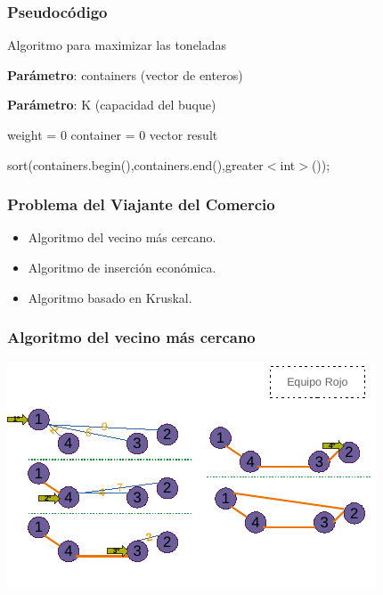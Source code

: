 \documentclass[13pt]{beamer}
\begin{document}
	\begin{frame}
		\frametitle{Pseudocódigo}
		\begin{algorithm}[H]
			\caption{Algoritmo para maximizar las toneladas}\label{alg:max_toneladas}
			\begin{minipage}{0.92\textwidth}
		
			\textbf{Parámetro}: containers (vector de enteros)
		
			\textbf{Parámetro}: K (capacidad del buque)
		
			\end{minipage}
		
			weight = 0\;
			container = 0\;
			vector result\;
		  
			sort(containers.begin(),containers.end(),greater$<$int$>$());
		
		  
		
		\end{algorithm}
	\end{frame}

    \begin{frame}
		\frametitle{Problema del Viajante del Comercio}

        \begin{itemize}
            \item Algoritmo del vecino más cercano.
            \item Algoritmo de inserción económica.
            \item Algoritmo basado en Kruskal.
        \end{itemize}

	\end{frame}

    \begin{frame}
		\frametitle{Algoritmo del vecino más cercano}
		\begin{center}
			\includegraphics[scale=1.5]{./img/DibVecCercano.pdf}
		\end{center}
	\end{frame}
\end{document}
